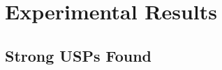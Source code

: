 \documentclass[11pt]{article}
\begin{document}
\begin{comment}
  Not planning to discuss:
  \begin{itemize}
  \item A$^*$ + admissible heuristics.
  \item Upper bounds from A$^*$.
  \item Symmetry removal.
  \end{itemize}
\end{comment}

\section{Experimental Results}
\label{sec:results}

\subsection{Strong USPs Found}
\label{subsec:usps_found}
\end{document}

